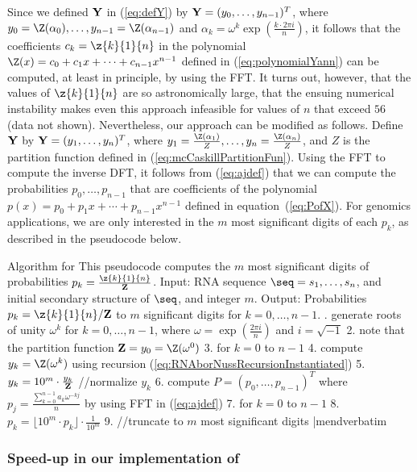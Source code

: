 Since we defined $\bf Y$ in (\ref{eq:defY}) by ${\bf Y} =
(y_0,\ldots,y_{n-1})^T$, where
$y_0=\Z(\alpha_0),\ldots, y_{n-1}=\Z(\alpha_{n-1})$ and $\alpha_k = \omega^k
\exp(\frac{k \cdot 2\pi i}{n})$, it follows that the coefficients
$c_k=\z{k}{1}{n}$ in the polynomial
$\Z(x) = c_0 + c_1 x + \cdots + c_{n-1} x^{n-1}$ defined in
(\ref{eq:polynomialYann}) can be computed, at least in principle,
by using the FFT. It turns out, however, that the values of
$\z{k}{1}{n}$ are so astronomically large, that the ensuing numerical
instability makes even this approach infeasible for values of $n$
that exceed $56$ (data not shown).
Nevertheless, our approach can be modified as follows.
Define $\bf Y$ by ${\bf Y} = (y_1,\ldots,y_n)^T$, where
$y_1=\frac{\Z(\alpha_1)}{Z},\ldots, y_{n}=\frac{\Z(\alpha_{n})}{Z}$, and
$Z$ is the partition function defined in (\ref{eq:mcCaskillPartitionFun}).
Using the FFT to compute the inverse DFT, it follows from
(\ref{eq:ajdef}) that we can compute the probabilities $p_0,\ldots,p_{n-1}$
that are coefficients of the polynomial
$p(x)=p_0+p_1 x + \cdots + p_{n-1}x^{n-1}$
defined in equation~(\ref{eq:PofX}). For genomics applications, we are
only interested in the $m$ most significant digits of each $p_k$, as described
in the pseudocode below.
\medskip

\noindent
{\sc Algorithm} for \fftbor\hfill\break
This pseudocode computes the $m$ most significant digits
of probabilities $p_k = \frac{\z{k}{1}{n}}{{\bf Z}}$. \hfill\break
{\sc Input:} RNA sequence $\seq=s_1,\ldots,s_n$, and initial secondary
structure \strSt of $\seq$, and integer $m$. \hfill\break
{\sc Output:} Probabilities $p_k=\z{k}{1}{n}/{\bf Z}$ to $m$ significant digits for $k=0,\ldots,n-1$. \hfill\break
\smallskip
{}.  generate roots of unity $\omega^k$ for $k=0,\ldots,n-1$, where $\omega=\exp(\frac{2 \pi i}{n})$ and $i=\sqrt{-1}$
2.  note that the partition function ${\bf Z}=y_0=\Z(\omega^0)$
3.  for $k=0$ to $n-1$
4.    compute $y_k = \Z(\omega^k)$ using recursion (\ref{eq:RNAborNussRecursionInstantiated})
5.    $y_k = 10^m \cdot \frac{y_k}{{\bf Z}}$ //normalize $y_k$
6.  compute $P = (p_0,\ldots,p_{n-1})^T$ where $p_j =\frac{\sum_{k=0}^{n-1} a_k \omega^{-kj}}{n}$ by using FFT in (\ref{eq:ajdef})
7.  for $k=0$ to $n-1$
8.    $p_k = \lfloor 10^m \cdot p_k \rfloor \cdot \frac{1}{10^m}$
9.    //truncate to $m$ most significant digits
|mendverbatim
\medskip

\subsubsection*{Speed-up in our implementation of \fftbor}

